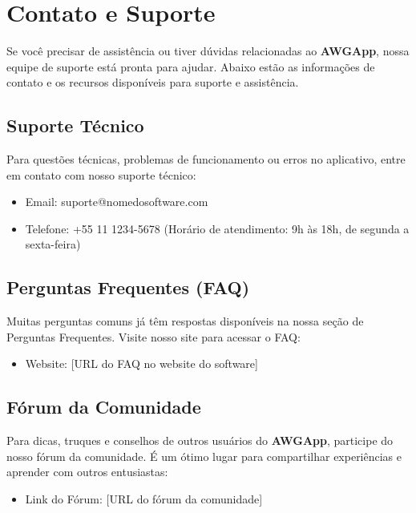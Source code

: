 \documentclass[12pt,a4paper]{book}
\newcommand{\nomesoftware}{AWGApp}
\begin{document}
\chapter{Contato e Suporte}

Se você precisar de assistência ou tiver dúvidas relacionadas ao \textbf{\nomesoftware{}}, nossa equipe de suporte está pronta para ajudar. Abaixo estão as informações de contato e os recursos disponíveis para suporte e assistência.

\section{Suporte Técnico}

Para questões técnicas, problemas de funcionamento ou erros no aplicativo, entre em contato com nosso suporte técnico:

\begin{itemize}
    \item Email: suporte@nomedosoftware.com
    \item Telefone: +55 11 1234-5678 (Horário de atendimento: 9h às 18h, de segunda a sexta-feira)
\end{itemize}

\section{Perguntas Frequentes (FAQ)}

Muitas perguntas comuns já têm respostas disponíveis na nossa seção de Perguntas Frequentes. Visite nosso site para acessar o FAQ:

\begin{itemize}
    \item Website: [URL do FAQ no website do software]
\end{itemize}

\section{Fórum da Comunidade}

Para dicas, truques e conselhos de outros usuários do \textbf{\nomesoftware{}}, participe do nosso fórum da comunidade. É um ótimo lugar para compartilhar experiências e aprender com outros entusiastas:

\begin{itemize}
    \item Link do Fórum: [URL do fórum da comunidade]
\end{itemize}
\end{document}
